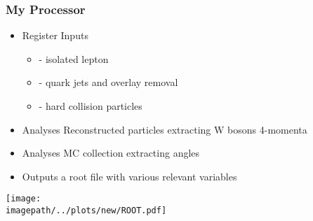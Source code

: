 \begin{frame}\frametitle{My Processor }
    \begin{minipage}{0.49\textwidth}
        \begin{itemize}
              \item Register Inputs
              \begin{itemize}
                    \item {} - isolated lepton
                    \item {} - quark jets and overlay removal
                    \item {} - hard collision particles
              \end{itemize}
              \item Analyses Reconstructed particles extracting W bosons 4-momenta
              \item Analyses MC collection extracting angles
              \item Outputs a root file with various relevant variables
       \end{itemize}
    \end{minipage}\hfill
    \begin{minipage}{0.49\textwidth}
        \texttt{[image: \\imagepath/../plots/new/ROOT.pdf]}
    \end{minipage}
\end{frame}


